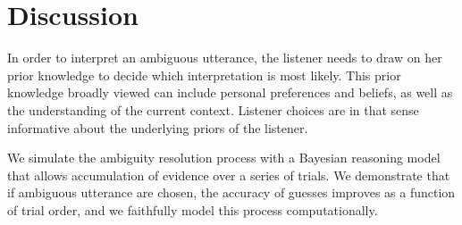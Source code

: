 \documentclass[10pt,a4paper]{article}
\begin{document}
%

\section{Discussion}

In order to interpret an ambiguous utterance, the listener needs to draw on her prior knowledge to decide which interpretation is most likely. This prior knowledge broadly viewed can include personal preferences and beliefs, as well as the understanding of the current context. Listener choices are in that sense informative about the underlying priors of the listener. 

We simulate the ambiguity resolution process with a Bayesian reasoning model that allows accumulation of evidence over a series of trials. We demonstrate that if ambiguous utterance are chosen, the accuracy of guesses improves as a function of trial order, and we faithfully model this process computationally.


%
%


\setlength{\bibleftmargin}{.125in}
\setlength{\bibindent}{-\bibleftmargin}


\end{document}
